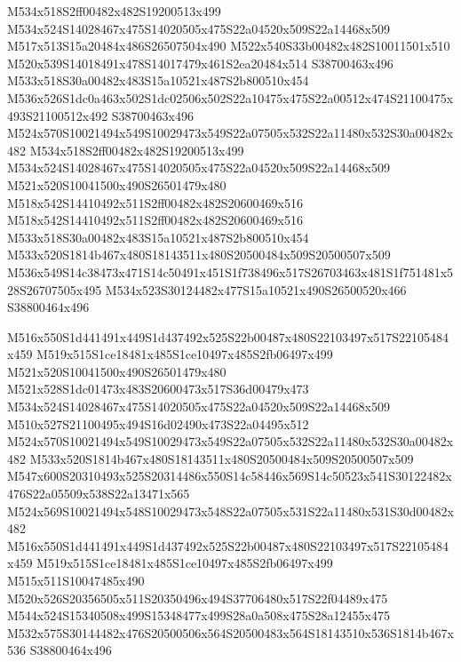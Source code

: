 \documentclass{article}
\begin{document}
\begin{multicols}{2}
M534x518S2ff00482x482S19200513x499 M534x524S14028467x475S14020505x475S22a04520x509S22a14468x509 M517x513S15a20484x486S26507504x490 M522x540S33b00482x482S10011501x510 M520x539S14018491x478S14017479x461S2ea20484x514 S38700463x496 M533x518S30a00482x483S15a10521x487S2b800510x454 M536x526S1dc0a463x502S1dc02506x502S22a10475x475S22a00512x474S21100475x493S21100512x492 S38700463x496 M524x570S10021494x549S10029473x549S22a07505x532S22a11480x532S30a00482x482 M534x518S2ff00482x482S19200513x499 M534x524S14028467x475S14020505x475S22a04520x509S22a14468x509 M521x520S10041500x490S26501479x480 M518x542S14410492x511S2ff00482x482S20600469x516 M518x542S14410492x511S2ff00482x482S20600469x516 M533x518S30a00482x483S15a10521x487S2b800510x454 M533x520S1814b467x480S18143511x480S20500484x509S20500507x509 M536x549S14c38473x471S14c50491x451S1f738496x517S26703463x481S1f751481x528S26707505x495 M534x523S30124482x477S15a10521x490S26500520x466 S38800464x496

M516x550S1d441491x449S1d437492x525S22b00487x480S22103497x517S22105484x459 M519x515S1ce18481x485S1ce10497x485S2fb06497x499 M521x520S10041500x490S26501479x480 M521x528S1dc01473x483S20600473x517S36d00479x473 M534x524S14028467x475S14020505x475S22a04520x509S22a14468x509 M510x527S21100495x494S16d02490x473S22a04495x512 M524x570S10021494x549S10029473x549S22a07505x532S22a11480x532S30a00482x482 M533x520S1814b467x480S18143511x480S20500484x509S20500507x509 M547x600S20310493x525S20314486x550S14c58446x569S14c50523x541S30122482x476S22a05509x538S22a13471x565 M524x569S10021494x548S10029473x548S22a07505x531S22a11480x531S30d00482x482 M516x550S1d441491x449S1d437492x525S22b00487x480S22103497x517S22105484x459 M519x515S1ce18481x485S1ce10497x485S2fb06497x499 M515x511S10047485x490 M520x526S20356505x511S20350496x494S37706480x517S22f04489x475 M544x524S15340508x499S15348477x499S28a0a508x475S28a12455x475 M532x575S30144482x476S20500506x564S20500483x564S18143510x536S1814b467x536 S38800464x496


\end{multicols}
\end{document}
